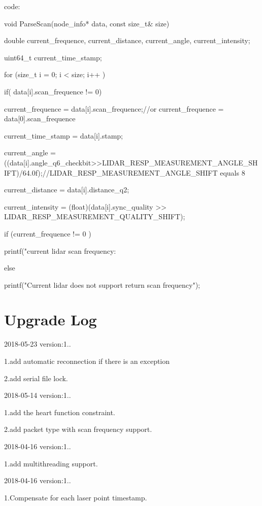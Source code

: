 code\+: \begin{DoxyVerb}    void ParseScan(node_info* data, const size_t& size) {

        double current_frequence, current_distance, current_angle, current_intensity;

        uint64_t current_time_stamp;

        for (size_t i = 0; i < size; i++ ) {

            if( data[i].scan_frequence != 0) {

                current_frequence =  data[i].scan_frequence;//or current_frequence = data[0].scan_frequence

            }

            current_time_stamp = data[i].stamp;

            current_angle = ((data[i].angle_q6_checkbit>>LIDAR_RESP_MEASUREMENT_ANGLE_SHIFT)/64.0f);//LIDAR_RESP_MEASUREMENT_ANGLE_SHIFT equals 8

            current_distance =  data[i].distance_q2;

            current_intensity = (float)(data[i].sync_quality >> LIDAR_RESP_MEASUREMENT_QUALITY_SHIFT);

        }

        if (current_frequence != 0 ) {

            printf("current lidar scan frequency: %

        } else {

            printf("Current lidar does not support return scan frequency\n");

        }
    }
\end{DoxyVerb}


\section*{Upgrade Log }

2018-\/05-\/23 version\+:1..

1.\+add automatic reconnection if there is an exception

2.\+add serial file lock.

2018-\/05-\/14 version\+:1..

1.\+add the heart function constraint.

2.\+add packet type with scan frequency support.

2018-\/04-\/16 version\+:1..

1.\+add multithreading support.

2018-\/04-\/16 version\+:1..

1.\+Compensate for each laser point timestamp. 